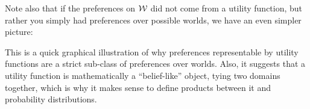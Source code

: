 \documentclass{article}
\theoremstyle{plain}
\theoremstyle{definition}
\theoremstyle{remark}
\begin{document}
	\begin{center}
	\end{center}\vspace{1em}
	
	Note also that if the preferences on $\cal W$ did not come from a utility function, but rather you simply had preferences over possible worlds, we have an even simpler picture:
	
	\begin{center}
	\end{center}\vspace{1em}
	
	This is a quick graphical illustration of why preferences representable by utility functions are a strict sub-class of preferences over worlds. Also, it suggests that a utility function is mathematically a ``belief-like'' object, tying two domains together, which is why it makes sense to define products between it and probability distributions. 
	
\end{document}
